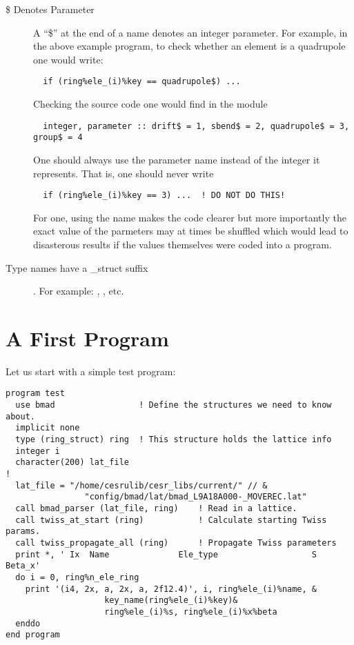 \begin{description}
\item[\$ Denotes Parameter] A ``\$'' at the end of a name denotes an 
integer parameter. For example, in the above example program, to check
whether an element is a quadrupole one would write:
\begin{verbatim}
  if (ring%ele_(i)%key == quadrupole$) ...
\end{verbatim}
Checking the source code one would find in the module 
\begin{verbatim}
  integer, parameter :: drift$ = 1, sbend$ = 2, quadrupole$ = 3, group$ = 4
\end{verbatim}
One should always use the parameter name instead of the integer it represents.
That is, one should never write
\begin{verbatim}
  if (ring%ele_(i)%key == 3) ...  ! DO NOT DO THIS!
\end{verbatim}
For one, using the name makes the code clearer but more importantly
the exact value of the parmeters may at times be shuffled which would
lead to disasterous results if the values themselves were coded into a
program.

\item[ Type names have a \_struct suffix]. For example: , 
, etc.

\end{description}

\section{A First Program}

Let us start with a simple test program:
\begin{verbatim}
program test
  use bmad                 ! Define the structures we need to know about.
  implicit none
  type (ring_struct) ring  ! This structure holds the lattice info
  integer i
  character(200) lat_file
!
  lat_file = "/home/cesrulib/cesr_libs/current/" // &
                "config/bmad/lat/bmad_L9A18A000-_MOVEREC.lat"
  call bmad_parser (lat_file, ring)    ! Read in a lattice.
  call twiss_at_start (ring)           ! Calculate starting Twiss params.
  call twiss_propagate_all (ring)      ! Propagate Twiss parameters
  print *, ' Ix  Name              Ele_type                   S      Beta_x'
  do i = 0, ring%n_ele_ring
    print '(i4, 2x, a, 2x, a, 2f12.4)', i, ring%ele_(i)%name, &
                    key_name(ring%ele_(i)%key)&
                    ring%ele_(i)%s, ring%ele_(i)%x%beta
  enddo
end program
\end{verbatim}


